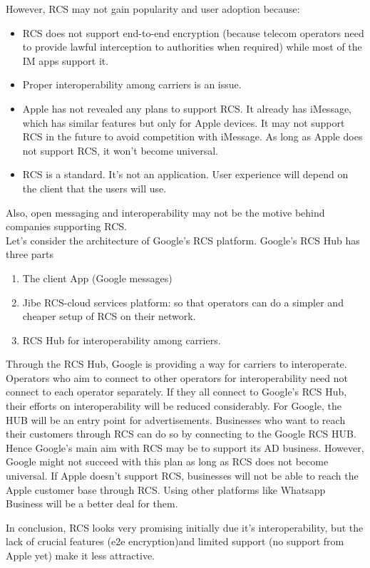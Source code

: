 \documentclass[12pt, conference, a4paper]{article}
\begin{document}
However, RCS may not gain popularity and user adoption because:
\begin{itemize}
\item RCS does not support end-to-end encryption (because telecom operators need to provide lawful interception to authorities when required) while most of the IM apps support it.
\item Proper interoperability among carriers is an issue.
\item Apple has not revealed any plans to support RCS. It already has iMessage, which has similar features but only for Apple devices. It may not support RCS in the future to avoid competition with iMessage. As long as Apple does not support RCS, it won't become universal.
\item RCS is a standard. It's not an application. User experience will depend on the client that the users will use.
\end{itemize}
Also, open messaging and interoperability may not be the motive behind companies supporting RCS. \cite{rcs-google} \\
Let's consider the architecture of Google's RCS platform.
Google's RCS Hub has three parts
\begin{enumerate}
\item The client App (Google messages)
\item Jibe RCS-cloud services platform: so that operators can do a simpler and cheaper setup of RCS on their network.
\item RCS Hub for interoperability among carriers.
\end{enumerate}
Through the RCS Hub, Google is providing a way for carriers to interoperate. Operators who aim to connect to other operators for interoperability need not connect to each operator separately. If they all connect to Google's RCS Hub, their efforts on interoperability will be reduced considerably.
For Google, the HUB will be an entry point for advertisements. Businesses who want to reach their customers through RCS can do so by connecting to the Google RCS HUB. \\
Hence Google's main aim with RCS may be to support its AD business. 
However, Google might not succeed with this plan as long as RCS does not become universal. If Apple doesn’t support RCS, businesses will not be able to reach the Apple customer base through RCS. Using other platforms like Whatsapp Business will be a better deal for them. 
\par
In conclusion, RCS looks very promising initially due it's interoperability, but the lack of crucial features (e2e encryption)and limited support (no support from Apple yet) make it less attractive.
\end{document}
